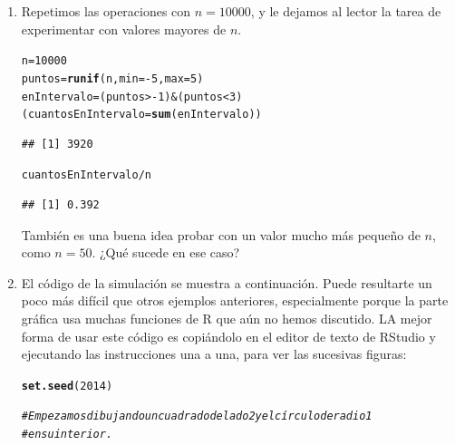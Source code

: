 \documentclass[10pt,a4paper]{article}\usepackage[]{graphicx}\usepackage[]{color}
\makeatletter
\newcommand{\hlnum}[1]{\textcolor[rgb]{0.686,0.059,0.569}{#1}}%
\newcommand{\hlcom}[1]{\textcolor[rgb]{0.678,0.584,0.686}{\textit{#1}}}%
\newcommand{\hlopt}[1]{\textcolor[rgb]{0,0,0}{#1}}%
\newcommand{\hlstd}[1]{\textcolor[rgb]{0.345,0.345,0.345}{#1}}%
\newcommand{\hlkwb}[1]{\textcolor[rgb]{0.69,0.353,0.396}{#1}}%
\newcommand{\hlkwc}[1]{\textcolor[rgb]{0.333,0.667,0.333}{#1}}%
\newcommand{\hlkwd}[1]{\textcolor[rgb]{0.737,0.353,0.396}{\textbf{#1}}}%
\newenvironment{kframe}{%
 \def\at@end@of@kframe{}%
 \ifinner\ifhmode%
  \def\at@end@of@kframe{\end{minipage}}%
  \begin{minipage}{\columnwidth}%
 \fi\fi%
 \def\FrameCommand##1{\hskip\@totalleftmargin \hskip-\fboxsep
 \colorbox{shadecolor}{##1}\hskip-\fboxsep
     \hskip-\linewidth \hskip-\@totalleftmargin \hskip\columnwidth}%
 \MakeFramed {\advance\hsize-\width
   \@totalleftmargin\z@ \linewidth\hsize
   \@setminipage}}%
 {\par\unskip\endMakeFramed%
 \at@end@of@kframe}
\newenvironment{knitrout}{}{} %
\newcounter{cont01}
\makeatother
\begin{document}
\begin{enumerate}
  \item Repetimos las operaciones con $n=10000$, y le dejamos al lector la tarea de experimentar con valores mayores de $n$.
\begin{knitrout}
\color{fgcolor}\begin{kframe}
\begin{alltt}
\hlstd{n} \hlkwb{=} \hlnum{10000}
\hlstd{puntos} \hlkwb{=} \hlkwd{runif}\hlstd{(n,} \hlkwc{min}\hlstd{=}\hlopt{-}\hlnum{5}\hlstd{,} \hlkwc{max}\hlstd{=}\hlnum{5}\hlstd{)}
\hlstd{enIntervalo} \hlkwb{=} \hlstd{(puntos} \hlopt{> -}\hlnum{1} \hlstd{)} \hlopt{&} \hlstd{(puntos} \hlopt{<} \hlnum{3}\hlstd{)}
\hlstd{(cuantosEnIntervalo} \hlkwb{=} \hlkwd{sum}\hlstd{(enIntervalo))}
\end{alltt}
\begin{verbatim}
## [1] 3920
\end{verbatim}
\begin{alltt}
\hlstd{cuantosEnIntervalo} \hlopt{/} \hlstd{n}
\end{alltt}
\begin{verbatim}
## [1] 0.392
\end{verbatim}
\end{kframe}
\end{knitrout}
  También es una buena idea probar con un valor mucho más pequeño de $n$, como $n=50$. ¿Qué sucede en ese caso?

  \item El código de la simulación se muestra a continuación. Puede resultarte un poco más difícil que otros ejemplos anteriores, especialmente porque la parte gráfica usa muchas funciones de R que aún no hemos discutido. LA mejor forma de usar este código es copiándolo en el editor de texto de RStudio y ejecutando las instrucciones una a una, para ver las sucesivas figuras:

\begin{knitrout}
\color{fgcolor}\begin{kframe}
\begin{alltt}
\hlkwd{set.seed}\hlstd{(}\hlnum{2014}\hlstd{)}

\hlcom{# Empezamos dibujando un cuadrado de lado 2 y el círculo de radio 1}
\hlcom{# en su interior.}


\end{alltt}
\end{kframe}
\end{knitrout}
\end{enumerate}
\end{document}

